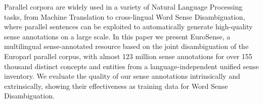 Parallel corpora are widely used in a variety of Natural Language Processing tasks, from Machine Translation to cross-lingual Word Sense Disambiguation, where parallel sentences can be exploited to automatically generate high-quality sense annotations on a large scale. In this paper we present EuroSense, a multilingual sense-annotated resource based on the joint disambiguation of the Europarl parallel corpus, with almost 123 million sense annotations for over 155 thousand distinct concepts and entities from a language-independent unified sense inventory. We evaluate the quality of our sense annotations intrinsically and extrinsically, showing their effectiveness as training data for Word Sense Disambiguation.
